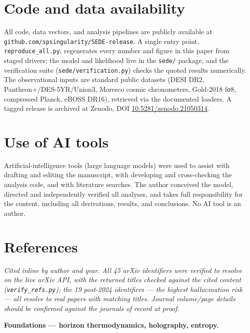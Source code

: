\documentclass[
  10pt,
]{article}
\begin{document}
\section{Code and data availability}\label{code-and-data-availability}

All code, data vectors, and analysis pipelines are publicly available at
\texttt{github.com/spsingularity/SEDE-release}. A single entry point,
\texttt{reproduce\_all.py}, regenerates every number and figure in this
paper from staged drivers; the model and likelihood live in the
\texttt{sede/} package, and the verification suite
(\texttt{sede/verification.py}) checks the quoted results numerically.
The observational inputs are standard public datasets (DESI DR2,
Pantheon+/DES-5YR/Union3, Moresco cosmic chronometers, Gold-2018 fσ8,
compressed Planck, eBOSS DR16), retrieved via the documented loaders. A
tagged release is archived at Zenodo, DOI
\href{https://doi.org/10.5281/zenodo.21050314}{10.5281/zenodo.21050314}.

\section{Use of AI tools}\label{use-of-ai-tools}

Artificial-intelligence tools (large language models) were used to
assist with drafting and editing the manuscript, with developing and
cross-checking the analysis code, and with literature searches. The
author conceived the model, directed and independently verified all
analyses, and takes full responsibility for the content, including all
derivations, results, and conclusions. No AI tool is an author.

\section{References}\label{references}

\emph{Cited inline by author and year. All 45 arXiv identifiers were
verified to resolve on the live arXiv API, with the returned titles
checked against the cited content (\texttt{verify\_refs.py}); the 19
post-2024 identifiers --- the highest hallucination risk --- all resolve
to real papers with matching titles. Journal volume/page details should
be confirmed against the journals of record at proof.}

\textbf{Foundations --- horizon thermodynamics, holography, entropy.}
\end{document}
